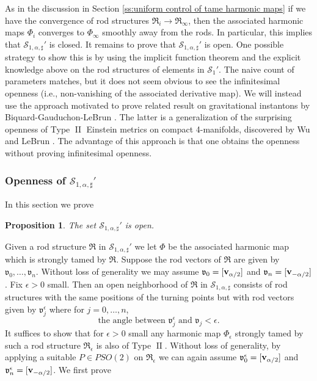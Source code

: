 \documentclass[a4paper,11pt]{amsart}
\newtheorem{proposition}[theorem]{Proposition}
\theoremstyle{definition}
\numberwithin{equation}{section}
\newcommand{\mv} {\mathfrak v}
\newcommand{\mR} {\mathfrak R}
\DeclareMathOperator{\II}{II}
\DeclareMathOperator{\bv}{{\bf v}}
\begin{document}
As in the discussion in Section \ref{ss:uniform control of tame harmonic maps} if we have the convergence of rod structures $\mR_i\rightarrow \mR_\infty$, then the associated harmonic maps $\Phi_i$ converges to $\Phi_\infty$ smoothly away from the rods. In particular, this implies that $\mathcal S_{1,\alpha,\sharp}'$ is closed. It  remains to prove that $\mathcal S_{1,\alpha,\sharp}'$  is open. One possible strategy to show this is by using the implicit function theorem and the explicit knowledge above on the rod structures of elements in $\mathcal S_1'$. The naive count of parameters matches, but it does not seem obvious to see the infinitesimal openness (i.e., non-vanishing of the associated derivative map). We will instead use the approach motivated to prove related result on gravitational instantons by Biquard-Gauduchon-LeBrun \cite{BGL}. The latter is a generalization of the surprising openness of Type $\II$ Einstein metrics on compact 4-manifolds, discovered by Wu \cite{Wu} and LeBrun \cite{LeBrun}. The advantage of this approach is that one obtains the openness without proving infinitesimal openness. 



\subsubsection{Openness of $\mathcal S_{1,\alpha,\sharp}'$} 
\label{subsubsec:openness of Type II}

In this section we prove
\begin{proposition}\label{prop:openness Type II}
    The set $\mathcal{S}_{1,\alpha,\sharp}'$ is open.
\end{proposition}


Given a rod structure $\mR$ in $\mathcal{S}_{1,\alpha,\sharp}'$ we let $\Phi$ be the associated harmonic map which is strongly tamed by $\mR$. Suppose the rod vectors of $\mR$ are given by $\mv_0,\ldots,\mv_n$. Without loss of generality we may assume $\mv_0=[\bv_{\alpha/2}]$ and $\mv_n=[\bv_{-\alpha/2}]$. Fix $\epsilon>0$ small. Then an open neighborhood of $\mR$ in $\mathcal{S}_{1,\alpha,\sharp}$ consists of rod structures with the same positions of the turning points but with rod vectors given by $\mv_j^\epsilon$ where for $j=0,\ldots,n$,
$$\text{the angle between }\mv_j^{\epsilon} \text{ and }\mv_j<\epsilon.$$
It suffices to show that for $\epsilon>0$ small any harmonic map $\Phi_\epsilon$ strongly tamed by such a rod structure $\mR_\epsilon$ is also of Type $\II$. Without loss of generality, by applying a suitable $P\in PSO(2)$ on $\mR_\epsilon$ we can again assume $\mv_0^\epsilon=[\bv_{\alpha/2}]$ and $\mv_n^\epsilon=[\bv_{-\alpha/2}]$.
We first prove
\end{document}
